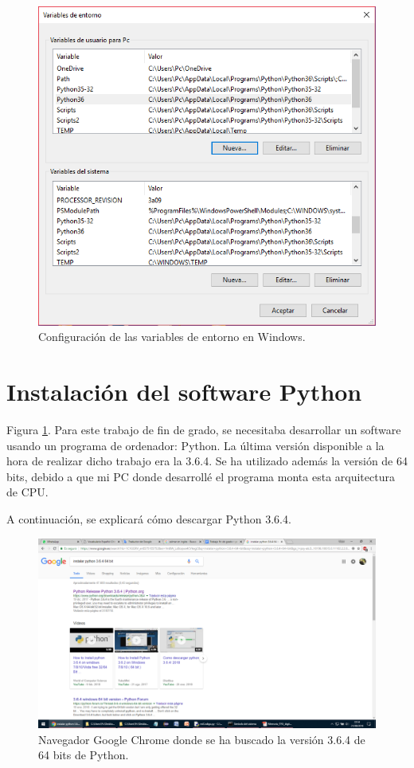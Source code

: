 \begin{figure}[h!]
  	\centering
	\includegraphics[width=\textwidth]{CapturasInstalacionPython/unnamed.png}
	\caption{Configuración de las variables de entorno en Windows.
	\label{fig:CapturasInstalacionPython/unnamed.png}}
\end{figure}

\section{Instalación del software Python}

Figura \ref{fig:CapturasInstalacionPython/unnamed.png}. Para este trabajo de fin de grado, se necesitaba desarrollar un software usando un programa de ordenador: Python. La última versión disponible a la hora de realizar dicho trabajo era la 3.6.4. Se ha utilizado además la versión de 64 bits, debido a que mi PC donde desarrollé el programa monta esta arquitectura de CPU.

A continuación, se explicará cómo descargar Python 3.6.4.

\begin{figure}[h!]
  	\centering
	\includegraphics[width=\textwidth]{CapturasInstalacionPython/unnamed(1).png}
	\caption{Navegador Google Chrome donde se ha buscado la versión 3.6.4 de 64 bits de Python.
	\label{fig:CapturasInstalacionPython/unnamed(1).png}}
\end{figure}

